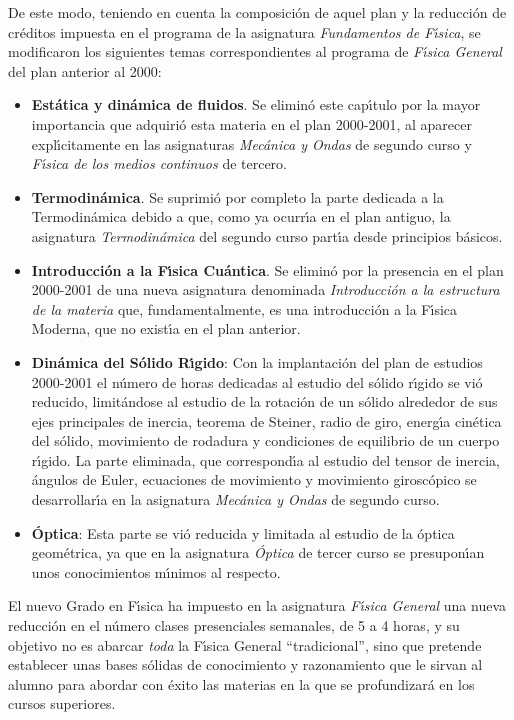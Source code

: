 De este modo, teniendo en cuenta la composici\'{o}n de aquel  plan
y la reducci\'{o}n de cr\'{e}ditos impuesta en el programa de la asignatura {\it Fundamentos de F\'{\i}sica}, 
se modificaron los siguientes temas correspondientes al programa 
de {\it F\'{\i}sica General} del plan anterior al 2000:
\begin {itemize}
\item {\bf  Est\'{a}tica y din\'{a}mica de fluidos}.
 Se elimin\'{o} este cap\'{\i}tulo por la mayor importancia que adquiri\'{o} 
esta materia en el  plan 2000-2001, 
al aparecer expl\'{\i}citamente en las asignaturas
 {\it Mec\'{a}nica y Ondas} de segundo curso y 
{\it F\'{\i}sica de los medios continuos} de tercero.
\item {\bf  Termodin\'{a}mica}.
 Se suprimi\'{o} por completo la parte dedicada a la
 Termodin\'{a}mica debido a que, como ya ocurr\'{\i}a en el plan antiguo, 
la asignatura {\it Termodin\'{a}mica} del segundo curso part\'{\i}a desde
  principios b\'{a}sicos.
\item {\bf Introducci\'{o}n a la F\'{\i}sica Cu\'{a}ntica}.
 Se elimin\'{o} por la presencia en el plan 2000-2001 de una 
nueva asignatura denominada 
{\it Introducci\'{o}n a la estructura de la materia}
 que, fundamentalmente, es una introducci\'{o}n a 
la F\'{\i}sica Moderna, que no exist\'{\i}a en el plan anterior.
\item {\bf Din\'{a}mica del S\'{o}lido R\'{\i}gido}:
 Con la implantaci\'{o}n del plan de estudios 2000-2001 el 
n\'{u}mero de horas dedicadas al estudio del
 s\'{o}lido r\'{\i}gido se vi\'{o} reducido,
limit\'{a}ndose al estudio de la rotaci\'{o}n de un s\'{o}lido
 alrededor de sus ejes principales de inercia, teorema de Steiner, 
radio de giro, energ\'{\i}a cin\'{e}tica del s\'{o}lido, 
movimiento de rodadura y condiciones de equilibrio de un cuerpo r\'{\i}gido.
 La parte  eliminada, que correspond\'{\i}a al estudio del
 tensor de inercia, \'{a}ngulos de Euler, 
ecuaciones de movimiento y movimiento girosc\'{o}pico 
se desarrollar\'{\i}a en la asignatura {\it Mec\'{a}nica y Ondas}
 de segundo curso.
\item{\bf  \'{O}ptica}: 
Esta parte se vi\'{o}  reducida y
limitada al estudio de la \'{o}ptica geom\'{e}trica, 
ya que en la asignatura {\it \'{O}ptica} de tercer curso se presupon\'{\i}an
 unos conocimientos m\'{\i}nimos al respecto.
\end{itemize}

El nuevo Grado en F\'{\i}sica ha impuesto en la 
 asignatura  {\it F\'{\i}sica General} 
 una nueva reducci\'{o}n en el n\'{u}mero clases presenciales 
semanales, de 5 a 4 horas, 
y su objetivo no es abarcar {\it toda} la F\'{\i}sica General
``tradicional'', sino que pretende establecer unas bases s\'{o}lidas
de conocimiento y razonamiento que le sirvan al alumno
para abordar con \'{e}xito las materias en la que se profundizar\'{a}
en los cursos superiores.

